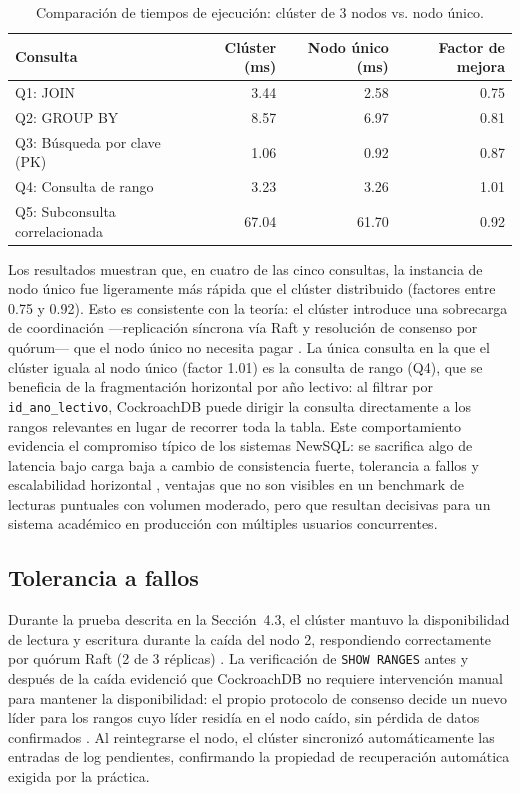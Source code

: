 \documentclass[10pt,a4paper]{article}
\begin{document}
\begin{table}[h]
\centering
\caption{Comparación de tiempos de ejecución: clúster de 3 nodos vs. nodo único.}
\label{tab:rendimiento}
\begin{tabular}{@{}lrrr@{}}
\toprule
\textbf{Consulta} & \textbf{Clúster (ms)} & \textbf{Nodo único (ms)} & \textbf{Factor de mejora} \\
\midrule
Q1: JOIN                     & 3.44  & 2.58  & 0.75 \\
Q2: GROUP BY                 & 8.57  & 6.97  & 0.81 \\
Q3: Búsqueda por clave (PK)  & 1.06  & 0.92  & 0.87 \\
Q4: Consulta de rango        & 3.23  & 3.26  & 1.01 \\
Q5: Subconsulta correlacionada & 67.04 & 61.70 & 0.92 \\
\bottomrule
\end{tabular}
\end{table}
 
Los resultados muestran que, en cuatro de las cinco consultas, la
instancia de nodo único fue ligeramente más rápida que el clúster
distribuido (factores entre 0.75 y 0.92). Esto es consistente con la
teoría: el clúster introduce una sobrecarga de coordinación —replicación
síncrona vía Raft y resolución de consenso por quórum— que el nodo único
no necesita pagar \cite{ongaro2014,taft2020}. La única consulta en la que
el clúster iguala al nodo único (factor 1.01) es la consulta de rango
(Q4), que se beneficia de la fragmentación horizontal por año lectivo: al
filtrar por \texttt{id\_ano\_lectivo}, CockroachDB puede dirigir la
consulta directamente a los rangos relevantes en lugar de recorrer toda la
tabla. Este comportamiento evidencia el compromiso típico de los sistemas
NewSQL: se sacrifica algo de latencia bajo carga baja a cambio de
consistencia fuerte, tolerancia a fallos y escalabilidad horizontal
\cite{abadi2012}, ventajas que no son visibles en un benchmark de
lecturas puntuales con volumen moderado, pero que resultan decisivas para
un sistema académico en producción con múltiples usuarios concurrentes.
 
\subsection{Tolerancia a fallos}
 
Durante la prueba descrita en la Sección~4.3, el clúster mantuvo la
disponibilidad de lectura y escritura durante la caída del nodo 2,
respondiendo correctamente por quórum Raft (2 de 3 réplicas)
\cite{ongaro2014}. La verificación de \texttt{SHOW RANGES} antes y después
de la caída evidenció que CockroachDB no requiere intervención manual para
mantener la disponibilidad: el propio protocolo de consenso decide un
nuevo líder para los rangos cuyo líder residía en el nodo caído, sin
pérdida de datos confirmados \cite{taft2020}. Al reintegrarse el nodo, el
clúster sincronizó automáticamente las entradas de log pendientes,
confirmando la propiedad de recuperación automática exigida por la
práctica.
\end{document}
